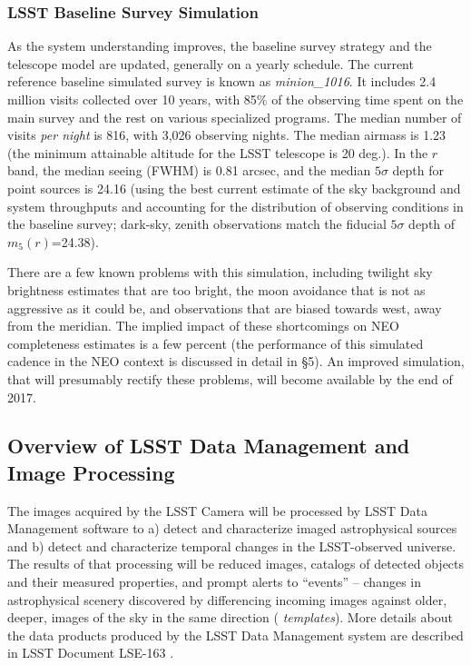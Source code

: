 \subsubsection{LSST Baseline Survey Simulation}

As the system understanding improves, the baseline survey strategy and the telescope model
are updated, generally on a yearly schedule. The current
reference baseline simulated survey is known as {\it minion\_1016}. It includes 2.4
million visits collected over 10 years, with 85\% of the observing time spent on the
main survey and the rest on various specialized programs. The median number of visits
{\it per night} is 816, with 3,026 observing nights. The median airmass is 1.23 (the
minimum attainable altitude for the LSST telescope is 20 deg.). In the $r$ band, the median
seeing (FWHM) is 0.81 arcsec, and the median $5\sigma$ depth for point sources is 24.16
(using the best current estimate of the sky background and system throughputs and accounting
for the distribution of observing conditions in the baseline survey; dark-sky, zenith observations
match the fiducial $5\sigma$ depth of $m_5(r)$=24.38).

There are a few known problems with this simulation, including twilight sky brightness
estimates that are too bright, the moon avoidance that is not as aggressive as it could be,
and observations that are biased towards west, away from the meridian. The implied impact
of these shortcomings on NEO completeness estimates is a few percent (the performance
of this simulated cadence in the NEO context is discussed in detail in \S5). An improved simulation,
that will presumably rectify these problems, will become available by the end of 2017.


\subsection{Overview of LSST  Data Management and Image Processing}

The images acquired by the LSST Camera will be processed by LSST Data Management
software \citep{juric15} to a) detect and characterize imaged
astrophysical sources and b) detect and characterize temporal changes
in the LSST-observed universe. The results of that processing will be
reduced images, catalogs of detected objects and their measured properties, and
prompt alerts to ``events'' -- changes in astrophysical scenery discovered by differencing
incoming images against older, deeper, images of the sky in the same direction ({\em
templates}). More details about the data products produced by the LSST Data Management system are described in
LSST Document LSE-163 \citep[LSST Data Products
Definition Document,][]{LSE-163}.

